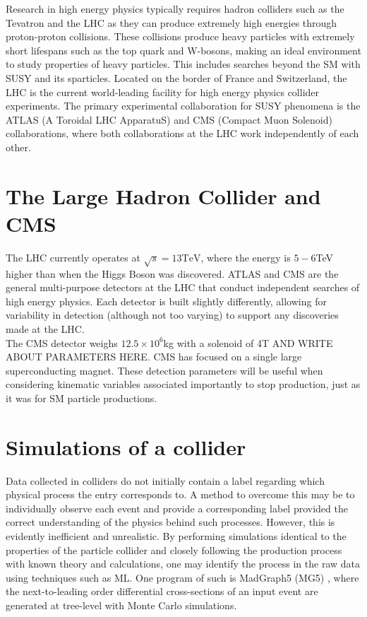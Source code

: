 Research in high energy physics typically requires hadron colliders such as the Tevatron and the LHC as they can produce extremely high energies through proton-proton collisions. These collisions produce heavy particles with extremely short lifespans such as the top quark and W-bosons, making an ideal environment to study properties of heavy particles. This includes searches beyond the SM with SUSY and its sparticles. Located on the border of France and Switzerland, the LHC is the current world-leading facility for high energy physics collider experiments. The primary experimental collaboration for SUSY phenomena is the ATLAS (A Toroidal LHC ApparatuS) \cite{collaboration2008atlas} and CMS (Compact Muon Solenoid) \cite{chatrchyan2008cms} collaborations, where both collaborations at the LHC work independently of each other.

\section{The Large Hadron Collider and CMS}
The LHC currently operates at $ \sqrt{s}=13 \text{TeV} $, where the energy is $5-6$TeV higher than when the Higgs Boson was discovered. ATLAS and CMS are the general multi-purpose detectors at the LHC that conduct independent searches of high energy physics. Each detector is built slightly differently, allowing for variability in detection (although not too varying) to support any discoveries made at the LHC. \\

The CMS detector \cite{chatrchyan2008cms} weighs $12.5\times10^6$kg with a solenoid of 4T AND WRITE ABOUT PARAMETERS HERE. CMS has focused on a single large superconducting magnet. These detection parameters will be useful when considering kinematic variables associated importantly to stop production, just as it was for SM particle productions.

\section{Simulations of a collider}
Data collected in colliders do not initially contain a label regarding which physical process the entry corresponds to. A method to overcome this may be to individually observe each event and provide a corresponding label provided the correct understanding of the physics behind such processes. However, this is evidently inefficient and unrealistic. By performing simulations identical to the properties of the particle collider and closely following the production process with known theory and calculations, one may identify the process in the raw data using techniques such as ML. One program of such is MadGraph5 (MG5) \cite{alwall2014automated, alwall2011madgraph}, where the next-to-leading order differential cross-sections of an input event are generated at tree-level with Monte Carlo simulations. \\

